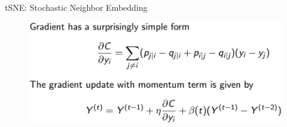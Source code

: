 \begin{frame}[allowframebreaks]{tSNE: Stochastic Neighbor Embedding}
    \begin{figure}
        \centering
        \includegraphics[width=1\textwidth,keepaspectratio]{images/dul/dim-reduce/tsne-gradient.jpg}
    \end{figure}

    \framebreak


\end{frame}
